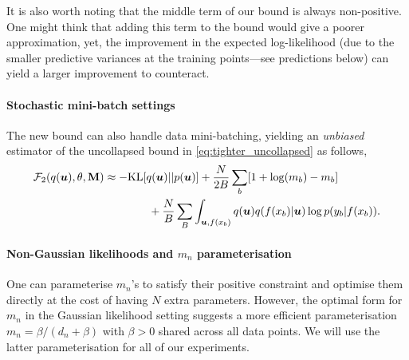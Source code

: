 It is also worth noting that the middle term of our bound is always non-positive. One might think that adding this term to the bound would give a poorer approximation, yet, the improvement in the expected log-likelihood (due to the smaller predictive variances at the training points---see predictions below) can yield a larger improvement to counteract.
 

\paragraph{Stochastic mini-batch settings}
The new bound can also handle data mini-batching, yielding an \emph{unbiased} estimator of the uncollapsed bound in \cref{eq:tighter_uncollapsed} as follows,
\begin{align}
    {\mathcal{F}}_2(q({\bm{u}}), \theta, {\mathbf{M}}) &\approx - \mathrm{KL} [q({\bm{u}}) || p({\bm{u}})] + \frac{N}{2B}\sum_b [1 + \log(m_b) - m_b] \nonumber \\ &\qquad\qquad + \frac{N}{B} \sum_{B} \int_{{\bm{u}}, f(x_b)} q({\bm{u}}) q(f({x_b}) | {\bm{u}}) \log p(y_b | f({x_b})).
\end{align}

\paragraph{Non-Gaussian likelihoods and $m_n$ parameterisation}
One can parameterise $m_n$'s to satisfy their positive constraint and optimise them directly at the cost of having $N$ extra parameters. However, the optimal form for $m_n$ in the Gaussian likelihood setting suggests a more efficient parameterisation $m_n = \beta / (d_n + \beta)$ with $\beta > 0$ shared across all data points. We will use the latter parameterisation for all of our experiments. 

